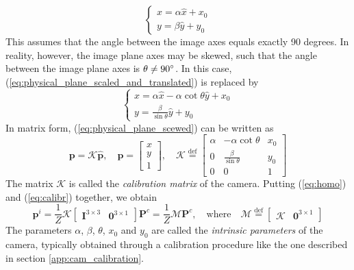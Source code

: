 \begin{equation}
\label{eq:physical_plane_scaled_and_translated}
    \begin{cases}
    x=\alpha\hat{x}+x_0\\
    y=\beta\hat{y}+y_0
    \end{cases}
\end{equation}
This assumes that the angle between the image axes equals exactly 90 degrees. In reality, however, the image plane axes may be skewed, such that the angle between the image plane axes is $\theta\neq90\degree$. In this case, (\ref{eq:physical_plane_scaled_and_translated}) is replaced by
\begin{equation}
\label{eq:physical_plane_scewed}
    \begin{cases}
    x=\alpha\hat{x}-\alpha\cot{\theta}\hat{y}+x_0\\
    y=\frac{\beta}{\sin{\theta}}\hat{y}+y_0
    \end{cases}
\end{equation}
In matrix form, (\ref{eq:physical_plane_scewed}) can be written as
\begin{equation}
\label{eq:calibr}
    \mathbf{p}=\mathcal{K}\mathbf{\hat{p}}, \quad \mathbf{p}=\begin{bmatrix}x\\y\\1\end{bmatrix},\quad \mathcal{K}\overset{\text{def}}{=}\begin{bmatrix}\alpha & -\alpha\cot{\theta} & x_0\\0 & \frac{\beta}{\sin{\theta}} & y_0\\0 & 0 & 1\end{bmatrix}
\end{equation}
The matrix $\mathcal{K}$ is called the \textit{calibration matrix} of the camera. Putting (\ref{eq:homo}) and (\ref{eq:calibr}) together, we obtain
\begin{equation}
\label{eq:intrinsics}
    \mathbf{p}^i=\frac{1}{Z}\mathcal{K}\begin{bmatrix}\mathbf{I}^{3\times3} & \mathbf{0}^{3\times1}\end{bmatrix}\mathbf{P}^c=\frac{1}{Z}\mathcal{M}\mathbf{P}^c,\quad \text{where}\quad \mathcal{M}\overset{\text{def}}{=}\begin{bmatrix}\mathcal{K} & \mathbf{0}^{3\times1}\end{bmatrix}
\end{equation}
The parameters $\alpha$, $\beta$, $\theta$, $x_0$ and $y_0$ are called the \textit{intrinsic parameters} of the camera, typically obtained through a calibration procedure like the one described in section \ref{app:cam_calibration}.
